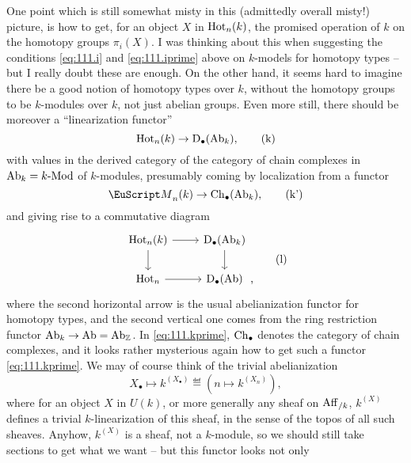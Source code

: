 One point which is still somewhat misty in this (admittedly overall
misty!) picture, is how to get, for an object $X$ in $\operatorname{Hot}_n(k)$,
the promised operation of $k$ on the homotopy groups $\pi_i(X)$. I was
thinking about this when suggesting the conditions \eqref{eq:111.i}
and \eqref{eq:111.iprime} above on $k$-models for homotopy types --
but I really doubt these are enough. On the other hand, it seems hard
to imagine there be a good notion of homotopy types over $k$, without
the homotopy groups to be $k$-modules over $k$, not just abelian
groups. Even more still, there should be moreover a ``linearization
functor''
\begin{equation}
  \label{eq:111.k}
  \operatorname{Hot}_n(k) \to {\ensuremath{\mathrm{D}}}_\bullet(\operatorname{Ab}_k),\tag{k}
\end{equation}
with values in the derived category of the category of chain complexes
in $\operatorname{Ab}_k= k\textup{-Mod}$ of $k$-modules, presumably coming by
localization from a functor
\begin{equation}
  \label{eq:111.kprime}
  \scrM_n(k)\to\Ch_\bullet(\AbOf_k),\tag{k'}
\end{equation}
and giving rise to a commutative diagram
\begin{equation}
  \label{eq:111.l}
  \begin{tabular}{@{}c@{}}
    \begin{tikzcd}[baseline=(O.base)]
      \HotOf_n(k)\ar[r]\ar[d] & \D_\bullet(\AbOf_k)\ar[d] \\
      \HotOf_n\ar[r] & |[alias=O]| \D_\bullet\Ab      
    \end{tikzcd},
  \end{tabular}\tag{l}
\end{equation}
where the second horizontal arrow is the usual abelianization functor
for homotopy types, and the second vertical one comes from the ring
restriction functor $\operatorname{Ab}_k\to\operatorname{Ab}=\operatorname{Ab}_{\mathbb{Z}}$. In
\eqref{eq:111.kprime}, ${\mathrm{Ch}}_\bullet$ denotes the category of chain
complexes, and it looks rather mysterious again how to get such a
functor \eqref{eq:111.kprime}. We may of course think of the trivial
abelianization
\[X_\bullet \mapsto k^{(X_\bullet)} \eqdef (n\mapsto k^{(X_n)}),\]
where for an object $X$ in $U(k)$, or more generally any sheaf on
$\operatorname{Aff}_{/k}$, $k^{(X)}$ defines a trivial $k$-linearization of this
sheaf, in the sense of the topos of all such sheaves. Anyhow,
$k^{(X)}$ is a sheaf, not a $k$-module, so we should still take
sections to get what we want -- but this functor looks not only
